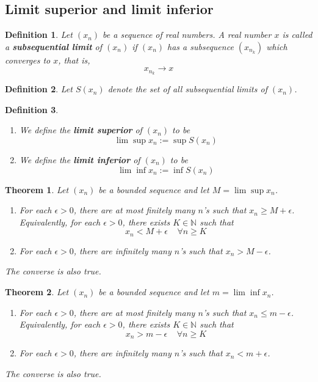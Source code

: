 \documentclass[12pt]{article}
\newtheorem{definition}{Definition}[section]
\newtheorem{theorem}{Theorem}[section]
\theoremstyle{definition}
\begin{document}
\subsection{Limit superior and limit inferior}
\begin{definition}\normalfont Let $(x_n)$ be a sequence of real numbers. A real number $x$ is called a \textbf{subsequential limit} of $(x_n)$ if $(x_n)$ has a subsequence $(x_{n_k})$ which converges to $x$, that is,
\[
x_{n_k}\to x
\]
\end{definition}
\begin{definition}\normalfont Let $S(x_n)$ denote the set of all subsequential limits of $(x_n)$.
\end{definition}
\begin{definition}\normalfont
\begin{enumerate}
\item We define the \textbf{limit superior} of $(x_n)$ to be
\[
\lim\sup x_n:=\sup S(x_n)
\]
\item We define the \textbf{limit inferior} of $(x_n)$ to be
\[
\lim\inf x_n:=\inf S(x_n)
\]
\end{enumerate}
\end{definition}
\begin{theorem}\normalfont Let $(x_n)$ be a bounded sequence and let $M = \lim\sup x_n$.
\begin{enumerate}
\item For each $\epsilon>0$, there are at most finitely many $n$'s such that $x_n\geq M+\epsilon$.\\
Equivalently, for each $\epsilon>0$, there exists $K\in\mathbb{N}$ such that
\[
x_n<M+\epsilon\;\;\;\;\forall n\geq K
\]
\item For each $\epsilon>0$, there are infinitely many $n$'s such that $x_n> M-\epsilon$.
\end{enumerate}
The converse is also true.
\end{theorem}
\begin{theorem}\normalfont Let $(x_n)$ be a bounded sequence and let $m = \lim\inf x_n$.
\begin{enumerate}
\item For each $\epsilon>0$, there are at most finitely many $n$'s such that $x_n\leq m-\epsilon$.\\
Equivalently, for each $\epsilon>0$, there exists $K\in\mathbb{N}$ such that
\[
x_n>m-\epsilon\;\;\;\;\forall n\geq K
\]
\item For each $\epsilon>0$, there are infinitely many $n$'s such that $x_n< m+\epsilon$.
\end{enumerate}
The converse is also true.
\end{theorem}
\end{document}
